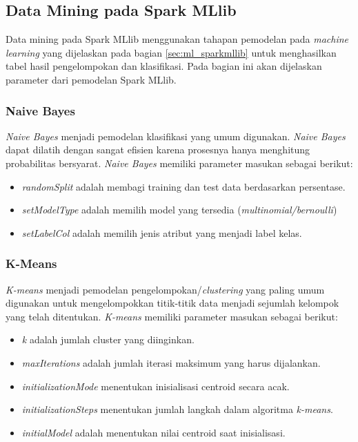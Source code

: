 \subsection{Data Mining pada Spark MLlib}
Data mining pada Spark MLlib menggunakan tahapan pemodelan pada \textit{machine learning} yang dijelaskan pada bagian \ref{sec:ml_sparkmllib} untuk menghasilkan tabel hasil pengelompokan dan klasifikasi. Pada bagian ini akan dijelaskan parameter dari pemodelan Spark MLlib.

\subsubsection{Naive Bayes}
\label{sec:naivebayes_mllib}
\textit{Naive Bayes} menjadi pemodelan klasifikasi yang umum digunakan. \textit{Naive Bayes} dapat dilatih dengan sangat efisien karena prosesnya hanya menghitung probabilitas bersyarat. \textit{Naive Bayes} memiliki parameter masukan sebagai berikut:
 
\begin{itemize}
\item \textit{randomSplit} adalah membagi training dan test data berdasarkan persentase.
\item \textit{setModelType} adalah memilih model yang tersedia (\textit{multinomial/bernoulli})
\item \textit{setLabelCol} adalah memilih jenis atribut yang menjadi label kelas.
\end{itemize}

\subsubsection{K-Means}
\label{sec:kmeans_mllib}
\textit{K-means} menjadi pemodelan pengelompokan/\textit{clustering} yang paling umum digunakan untuk mengelompokkan titik-titik data menjadi sejumlah kelompok yang telah ditentukan. \textit{K-means} memiliki parameter masukan sebagai berikut:

\begin{itemize}
\item \textit{k} adalah jumlah cluster yang diinginkan. 
\item \textit{maxIterations} adalah jumlah iterasi maksimum yang harus dijalankan.
\item \textit{initializationMode} menentukan inisialisasi centroid secara acak.
\item \textit{initializationSteps} menentukan jumlah langkah dalam algoritma \textit{k-means}.
\item \textit{initialModel} adalah menentukan nilai centroid saat inisialisasi.
\end{itemize}

